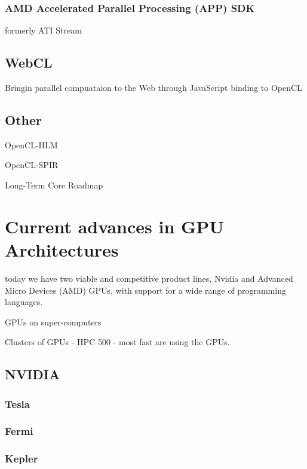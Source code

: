 \subsubsection{AMD Accelerated Parallel Processing (APP) SDK}
formerly ATI Stream






\subsection{WebCL}
Bringin parallel compuataion to the Web through JavaScript binding to OpenCL

\subsection{Other}

OpenCL-HLM

OpenCL-SPIR

Long-Term Core Roadmap



\section{Current advances in GPU Architectures}
today we have two viable and
competitive product lines, Nvidia and Advanced
Micro Devices (AMD) GPUs, with support for a
wide range of programming languages.

GPUs on super-computers

Clusters of GPUs - HPC 500 - most fast are using the GPUs.

\subsection{NVIDIA}
\subsubsection{Tesla}
\subsubsection{Fermi}
\subsubsection{Kepler}

